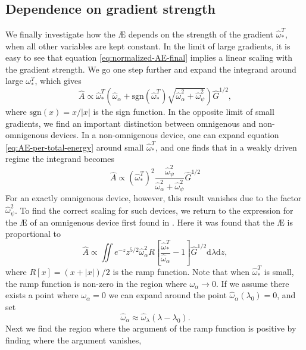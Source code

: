 \subsection{Dependence on gradient strength}
We finally investigate how the \AE{} depends on the strength of the gradient $\hat{\omega}_*^T$, when all other variables are kept constant. In the limit of large gradients, it is easy to see that equation \eqref{eq:normalized-AE-final} implies a linear scaling with the gradient strength. We go one step further and expand the integrand around large $\omega_*^T$, which gives
\begin{equation}
    \widehat{A} \propto  \hat{\omega}_*^T \left (\hat{\omega}_\alpha + \mathrm{sgn}(\hat{\omega}_*^T) \sqrt{\hat{\omega}_\alpha^2 + \hat{\omega}_\psi^2} \right) \hat{G}^{1/2},
\end{equation}
where $\mathrm{sgn}(x)=x/|x|$ is the sign function. In the opposite limit of small gradients, we find an important distinction between omnigenous and non-omnigenous devices. In a non-omnigenous device, one can expand equation \eqref{eq:AE-per-total-energy} around small $\hat{\omega}_*^T$, and one finds that in a weakly driven regime the integrand becomes
\begin{equation}
    \widehat{A} \propto (\hat{\omega}_*^T)^2 \frac{\hat{\omega}_\psi^2}{\hat{\omega}_\alpha^2+\hat{\omega}_\psi^2} \hat{G}^{1/2}
\end{equation}
For an exactly omnigenous device, however, this result vanishes due to the factor $\hat{\omega}_\psi^2$. To find the correct scaling for such devices, we return to the expression for the \AE{} of an omnigenous device first found in \cite{Helander2020AvailablePlasmas}. Here it was found that the \AE{} is proportional to
\begin{equation}
    \widehat{A} \propto \iint e^{-z} z^{5/2} \hat{\omega}_\alpha^2 R \left[ \frac{\hat{\omega}_*^T}{\hat{\omega}_\alpha} - 1 \right] \hat{G}^{1/2}  \mathrm{d} \lambda \mathrm{d} z,
\end{equation}
where $R[x] = (x + |x|)/2$ is the ramp function. Note that when $\hat{\omega}_*^T$ is small, the ramp function is non-zero in the region where $\omega_\alpha \rightarrow 0$. If we assume there exists a point where $\omega_\alpha=0$ we can expand around the point $\hat{\omega}_\alpha(\lambda_0) = 0$, and set
\begin{equation}
    \hat{\omega}_\alpha \approx \hat{\omega}_\lambda (\lambda - \lambda_0).
\end{equation}
Next we find the region where the argument of the ramp function is positive by finding where the argument vanishes,
